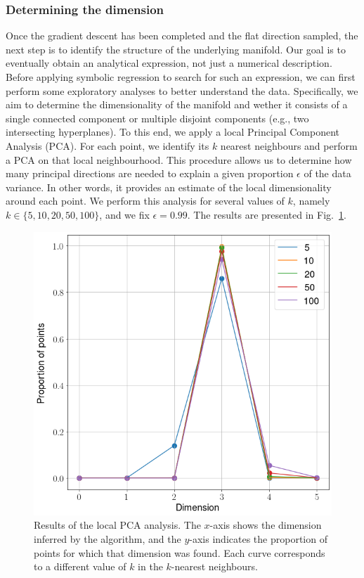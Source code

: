 \documentclass[11pt]{article}
\begin{document}
		\subsubsection{Determining the dimension}
		Once the gradient descent has been completed and the flat direction sampled, the next step is to identify the structure of the underlying manifold. Our goal is to eventually obtain an analytical expression, not just a numerical description. Before applying symbolic regression to search for such an expression, we can first perform some exploratory analyses to better understand the data. Specifically, we aim to determine the dimensionality of the manifold and wether it consists of a single connected component or multiple disjoint components (e.g., two intersecting hyperplanes).
		To this end, we apply a local Principal Component Analysis (PCA). For each point, we identify its $k$ nearest neighbours and perform a PCA on that local neighbourhood. This procedure allows us to determine how many principal directions are needed to explain a given proportion $\epsilon$ of the data variance. In other words, it provides an estimate of the local dimensionality around each point.
		We perform this analysis for several values of $k$, namely $k \in \{5, 10, 20, 50, 100\}$, and we fix $\epsilon = 0.99$. The results are presented in Fig. \ref{local_pca}.
		
		\begin{figure}[h!]
			\centering
			\includegraphics[scale=0.4]{Figures/Local_PCA.png}
			\caption{Results of the local PCA analysis. The $x$-axis shows the dimension inferred by the algorithm, and the $y$-axis indicates the proportion of points for which that dimension was found. Each curve corresponds to a different value of $k$ in the $k$-nearest neighbours.}
			\label{local_pca}
		\end{figure}
		
\end{document}
